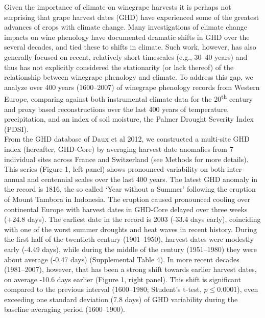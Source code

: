 \documentclass[final]{nature}
\begin{document}
\indent Given the importance of climate on winegrape harvests it is perhaps not surprising that grape harvest dates (GHD) have experienced some of the greatest advances of crops with climate change. Many investigations of climate change impacts on wine phenology have documented dramatic shifts in GHD over the several decades, and tied these to shifts in climate. Such work, however, has also generally focused on recent, relatively short timescales (e.g., 30--40 years\cite{Duchene:2005bd,tomasi2011,webb2012}) and thus has not explicitly considered the stationarity (or lack thereof) of the relationship between winegrape phenology and climate. To address this gap, we analyze over 400 years (1600--2007) of winegrape phenology records from Western Europe\cite{Daux2012}, comparing against both instrumental climate data for the 20\textsuperscript{th} century\cite{Harris2014} and proxy based reconstructions over the last 400 years of temperature\cite{Luterbacher2004}, precipitation\cite{Pauling2006}, and an index of soil moisture, the Palmer Drought Severity Index\cite{CookOWDA2015} (PDSI).\\
\indent From the GHD database of Daux et al 2012\cite{Daux2012}, we constructed a multi-site GHD index (hereafter, GHD-Core) by averaging harvest date anomalies from 7 individual sites across France and Switzerland (see Methods for more details). This series (Figure 1, left panel) shows pronounced variability on both inter-annual and centennial scales over the last 400 years. The latest GHD anomaly in the record is 1816, the so called `Year without a Summer' following the eruption of Mount Tambora in Indonesia\cite{Oppenheimer2003}. The eruption caused pronounced cooling over continental Europe with harvest dates in GHD-Core delayed over three weeks (+24.8 days). The earliest date in the record is 2003 (-33.4 days early), coinciding with one of the worst summer droughts and heat waves in recent history\cite{Rebetz2006}. During the first half of the twentieth century (1901--1950), harvest dates were modestly early (-4.49 days), while during the middle of the century (1951--1980) they were about average (-0.47 days) (Supplemental Table 4). In more recent decades (1981--2007), however, that has been a strong shift towards earlier harvest dates, on average -10.6 days earlier (Figure 1, right panel). This shift is significant compared to the previous interval (1600--1980; Student's t-test, $p\le0.0001$), even exceeding one standard deviation (7.8 days) of GHD variability during the baseline averaging period (1600--1900).\\
\end{document}
